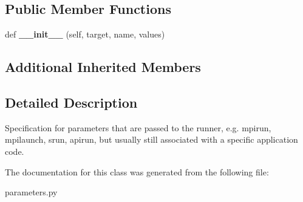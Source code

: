 \subsection*{Public Member Functions}
\begin{DoxyCompactItemize}
\item 
\mbox{\label{classcodar_1_1cheetah_1_1parameters_1_1_param_runner_aac032647089038378eedaa25c24775db}} 
def {\bfseries \+\_\+\+\_\+init\+\_\+\+\_\+} (self, target, name, values)
\end{DoxyCompactItemize}
\subsection*{Additional Inherited Members}


\subsection{Detailed Description}
\begin{DoxyVerb}Specification for parameters that are passed to the runner, e.g.
mpirun, mpilaunch, srun, apirun, but usually still associated with a
specific application code.\end{DoxyVerb}
 

The documentation for this class was generated from the following file\+:\begin{DoxyCompactItemize}
\item 
parameters.\+py\end{DoxyCompactItemize}
